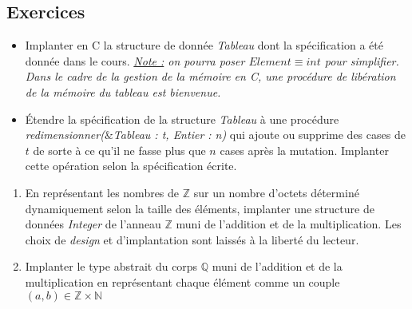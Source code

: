\documentclass[../../../main.tex]{subfiles}
\begin{document}
\subsection{Exercices}
\begin{itemize}
	\item Implanter en C la structure de donnée \textit{Tableau} dont la spécification a été donnée dans le cours.\newline
	\textit{\underline{Note :} on pourra poser $Element \equiv int$ pour simplifier. Dans le cadre de la gestion de la mémoire en C, une procédure de libération de la mémoire du tableau est bienvenue.}
	\item Étendre la spécification de la structure \textit{Tableau} à une procédure \textit{redimensionner($\&$Tableau : t, Entier : n)} qui ajoute ou supprime des cases de $t$ de sorte à ce qu'il ne fasse plus que $n$ cases après la mutation. Implanter cette opération selon la spécification écrite.
\end{itemize}
\begin{enumerate}
	\item En représentant les nombres de $\mathbb{Z}$ sur un nombre d'octets déterminé dynamiquement selon la taille des éléments, implanter une structure de données \textit{Integer} de l'anneau $\mathbb{Z}$ muni de l'addition et de la multiplication. Les choix de \textit{design} et d'implantation sont laissés à la liberté du lecteur.
	\item Implanter le type abstrait du corps $\mathbb{Q}$ muni de l'addition et de la multiplication en représentant chaque élément comme un couple $(a, b)\in\mathbb{Z}\times{\mathbb{N}}$
\end{enumerate}
\end{document}
